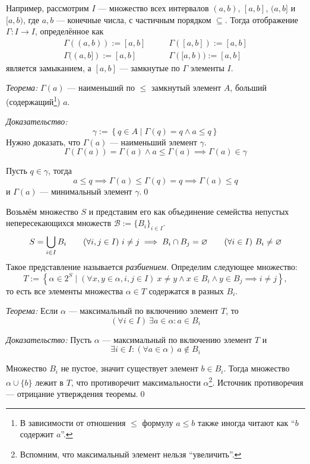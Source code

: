 Например, рассмотрим $I$ --- множество всех интервалов $(a,b)$, $[a,b]$, $(a,b]$
и $[a,b)$, где $a,b$ --- конечные числа, с частичным порядком $\subseteq$.
Тогда отображение $\Gamma:I\to I$, определённое как
\[\begin{array}{ll}
	\Gamma((a,b)):=[a,b]\qquad &\Gamma([a,b]):=[a,b]\\
	\Gamma((a,b]):=[a,b]\qquad &\Gamma([a,b)):=[a,b]
\end{array}
\]
является замыканием, а $[a,b]$ --- замкнутые по $\Gamma$ элементы $I$.

\vspace{1em}
{\it Теорема:} $\Gamma(a)$ --- наименьший по $\leq$ замкнутый элемент $A$,
больший (содержащий\footnote{В зависимости от отношения $\leq$ формулу
$a\leq b$ также иногда читают как ``$b$ содержит $a$''.}) $a$.

{\it Доказательство:}
\[
	\gamma:=\left\{q\in A\;\big|\; \Gamma(q)=q\land a\leq q\right\}
\]
Нужно доказать, что $\Gamma(a)$ --- наименьший элемент $\gamma$.
\[
	\Gamma(\Gamma(a))=\Gamma(a)\land a\leq\Gamma(a)\implies\Gamma(a)\in\gamma
\]

Пусть $q\in \gamma$, тогда
\[
	a\leq q\implies \Gamma(a)\leq\Gamma(q)=q\implies\Gamma(a)\leq q
\]
и $\Gamma(a)$ --- минимальный элемент $\gamma$.\qed

\newcommand\B{\mathcal B}
Возьмём множество $S$ и представим его как объединение семейства непустых
непересекающихся множеств $\B:=\{B_{i}\}_{i\in I}$.
\[
	S=\bigcup_{i\in I}B_{i}\qquad
	(\forall i,j\in I)~i\neq j\implies B_{i}\cap B_{j}=\varnothing\qquad
	(\forall i\in I)~B_{i}\neq\varnothing
\]
Такое представление называется {\it разбиением}.
Определим следующее множество:
\[
	T:=\left\{\alpha\in 2^{S}\;\big|\; (\forall x,y\in\alpha,i,j\in I)~
	x\neq y\land	x\in B_{i}\land y\in B_{j}\implies i\neq j\right\},
\]
то есть все элементы множества $\alpha\in T$ содержатся в разных $B_{i}$.

\vspace{1em}
{\it Теорема:} Если $\alpha$ --- максимальный по включению элемент $T$, то
\[
	(\forall i\in I)~\exists a\in\alpha:a\in B_{i}
\]

{\it Доказательство:}
Пусть $\alpha$ --- максимальный по включению элемент $T$ и
\[
	\exists i\in I:(\forall a\in\alpha)~a\notin B_{i}
\]

Множество $B_{i}$ не пустое, значит существует элемент $b\in B_{i}$.
Тогда множество $\alpha\cup \{b\}$ лежит в $T$, что противоречит
максимальности $\alpha$\footnote{Вспомним, что максимальный элемент
нельзя ``увеличить''.}.
Источник противоречия --- отрицание утверждения теоремы.\qed

